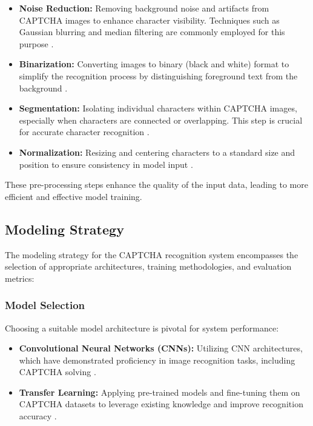 \documentclass[sigconf]{acmart}
\begin{document}
\begin{itemize} \item \textbf{Noise Reduction:} Removing background noise and artifacts from CAPTCHA images to enhance character visibility. Techniques such as Gaussian blurring and median filtering are commonly employed for this purpose \cite{turn0search5}. \item \textbf{Binarization:} Converting images to binary (black and white) format to simplify the recognition process by distinguishing foreground text from the background \cite{turn0search9}. \item \textbf{Segmentation:} Isolating individual characters within CAPTCHA images, especially when characters are connected or overlapping. This step is crucial for accurate character recognition \cite{turn0search15}. \item \textbf{Normalization:} Resizing and centering characters to a standard size and position to ensure consistency in model input \cite{turn0search13}. \end{itemize}

These pre-processing steps enhance the quality of the input data, leading to more efficient and effective model training.

\subsection{Modeling Strategy}

The modeling strategy for the CAPTCHA recognition system encompasses the selection of appropriate architectures, training methodologies, and evaluation metrics:

\subsubsection{Model Selection}

Choosing a suitable model architecture is pivotal for system performance:

\begin{itemize} \item \textbf{Convolutional Neural Networks (CNNs):} Utilizing CNN architectures, which have demonstrated proficiency in image recognition tasks, including CAPTCHA solving \cite{turn0search3}. \item \textbf{Transfer Learning:} Applying pre-trained models and fine-tuning them on CAPTCHA datasets to leverage existing knowledge and improve recognition accuracy \cite{turn0search8}. \end{itemize}
\end{document}

